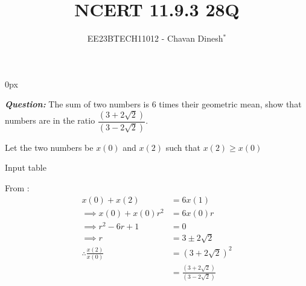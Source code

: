 \documentclass[journal,12pt,twocolumn]{IEEEtran}
\theoremstyle{remark}
\begin{document}
\parindent 0px

\vspace{3cm}

\title{NCERT 11.9.3 28Q}
\author{EE23BTECH11012 - Chavan Dinesh$^{*}$%
}
\maketitle
\newpage
\bigskip

\renewcommand{\thefigure}{\arabic{figure}}
\renewcommand{\thetable}{\arabic{table}}
\large\textbf{\textsl{Question:}}
The sum of two numbers is $6$ times their geometric mean, show that numbers are in the ratio $\dfrac{(3+2\sqrt{2})}{(3-2\sqrt{2})}$.

\solution
Let the two numbers be $x(0)$ and $x(2)$ such that $x(2)\geq x(0)$ 
\begin{table}[htbp]
    \centering
    
    \caption{Input table}
    \label{tab:parameter_table.11.9.3.28}
\end{table}

From :
\begin{align}
x(0) + x(2) &= 6x(1) \\
\implies x(0) + x(0)r^2 &= 6x(0)r \\
\implies r^2 - 6r +1 &= 0 \\
\implies r &= 3\pm 2\sqrt{2}\\
    \therefore \frac{x(2)}{x(0)} &= (3 + 2\sqrt{2})^2 \\
    &=  \frac{(3+2\sqrt{2})}{(3-2\sqrt{2})}
\end{align}


\end{document}
